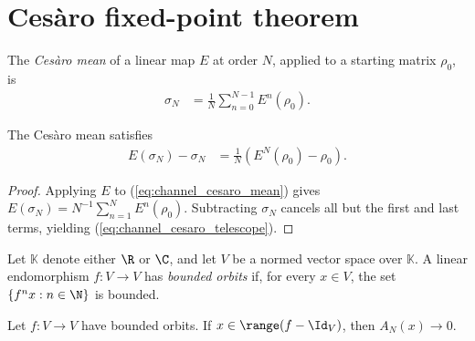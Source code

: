 \section{Ces\`aro fixed-point theorem}

\begin{definition}\label{def:cesaro_mean}
    \leanok
    The \emph{Ces\`aro mean} of a linear map $E$ at order $N$,
    applied to a starting matrix $\rho_0$, is
    \begin{align}
        \sigma_N
         & =\frac{1}{N}\sum_{n=0}^{N-1}E^n(\rho_0).
        \label{eq:channel_cesaro_mean}
    \end{align}
\end{definition}

\begin{theorem}\label{thm:cesaro_telescope}
    \leanok
    The Ces\`aro mean satisfies
    \begin{align}
        E(\sigma_N)-\sigma_N
         & =\frac{1}{N}(E^N(\rho_0)-\rho_0).
        \label{eq:channel_cesaro_telescope}
    \end{align}
\end{theorem}

\begin{proof}\leanok{}
    Applying $E$ to (\ref{eq:channel_cesaro_mean}) gives
    $E(\sigma_N)=N^{-1}\sum_{n=1}^{N}E^n(\rho_0)$.
    Subtracting $\sigma_N$ cancels all but the first and last terms, yielding
    (\ref{eq:channel_cesaro_telescope}).
\end{proof}

\begin{definition}
    \label{def:has_bounded_orbits}
    \leanok
    Let $\mathbb K$ denote either $\R$ or $\C$, and let $V$ be a normed
    vector space over $\mathbb K$. A linear endomorphism $f:V\to V$ has
    \emph{bounded orbits} if, for every $x\in V$, the set
    $\{f^n x:n\in\N\}$ is bounded.
\end{definition}

\begin{lemma}
    \label{lem:mean_ergodic_range_limit}
    \leanok
    Let $f:V\to V$ have bounded orbits. If
    $x\in\range(f-\Id_V)$, then $A_N(x)\longrightarrow 0$.
\end{lemma}

